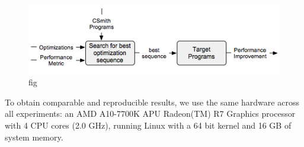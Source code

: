 \begin{figure}[h]
	\centering
	\includegraphics[width=1.\linewidth]{Ressources/sensitivity.png}
	\caption{fig}
\end{figure}

To obtain comparable and reproducible results, we use the same hardware across all experiments: an AMD A10-7700K APU Radeon(TM) R7 Graphics processor with 4 CPU cores (2.0 GHz), running Linux with a 64 bit kernel and 16 GB of system memory.


